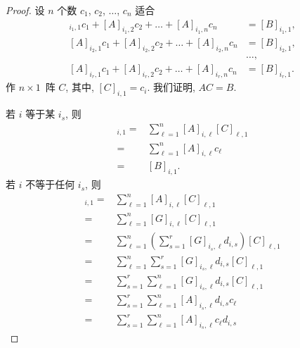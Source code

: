 \documentclass[../libro.tex]{subfiles}
\begin{document}
\begin{proof}
    设 \(n\) 个数
    \(c_1\), \(c_2\), \(\dots\), \(c_n\)
    适合
    \begin{align*}
        [A]_{i_1,1} c_1 + [A]_{i_1,2} c_2 + \dots + [A]_{i_1,n} c_n & = [B]_{i_1,1}, \\
        [A]_{i_2,1} c_1 + [A]_{i_2,2} c_2 + \dots + [A]_{i_2,n} c_n & = [B]_{i_2,1}, \\
        & \dots, \\
        [A]_{i_r,1} c_1 + [A]_{i_r,2} c_2 + \dots + [A]_{i_r,n} c_n & = [B]_{i_r,1}.
    \end{align*}
    作 \(n \times 1\)~阵 \(C\),
    其中, \([C]_{i,1} = c_i\).
    我们证明, \(AC = B\).

    若 \(i\) 等于某 \(i_s\), 则
    \begin{align*}
        [AC]_{i,1}
        = {} &
        \sum_{\ell = 1}^{n}
        {[A]_{i,\ell} [C]_{\ell,1}}
        \\
        = {} &
        \sum_{\ell = 1}^{n}
        {[A]_{i,\ell} c_\ell}
        \\
        = {} & [B]_{i,1}.
    \end{align*}
    若 \(i\) 不等于任何 \(i_s\), 则
    \begin{align*}
        [AC]_{i,1}
        = {} &
        \sum_{\ell = 1}^{n}
        {[A]_{i,\ell} [C]_{\ell,1}}
        \\
        = {} &
        \sum_{\ell = 1}^{n}
        {[G]_{i,\ell} [C]_{\ell,1}}
        \\
        = {} &
        \sum_{\ell = 1}^{n}
        {
            \left( \sum_{s = 1}^{r}
                {
                    [G]_{i_s,\ell} d_{i,s}
            } \right) [C]_{\ell,1}
        }
        \\
        = {} &
        \sum_{\ell = 1}^{n}
        {
            \sum_{s = 1}^{r}
            {
                [G]_{i_s,\ell} d_{i,s} [C]_{\ell,1}
            }
        }
        \\
        = {} &
        \sum_{s = 1}^{r}
        {
            \sum_{\ell = 1}^{n}
            {
                [G]_{i_s,\ell} d_{i,s} [C]_{\ell,1}
            }
        }
        \\
        = {} &
        \sum_{s = 1}^{r}
        {
            \sum_{\ell = 1}^{n}
            {
                [A]_{i_s,\ell} d_{i,s} c_\ell
            }
        }
        \\
        = {} &
        \sum_{s = 1}^{r}
        {
            \sum_{\ell = 1}^{n}
            {
                [A]_{i_s,\ell} c_\ell d_{i,s}
            }
}
\end{align*}
\end{proof}
\end{document}
